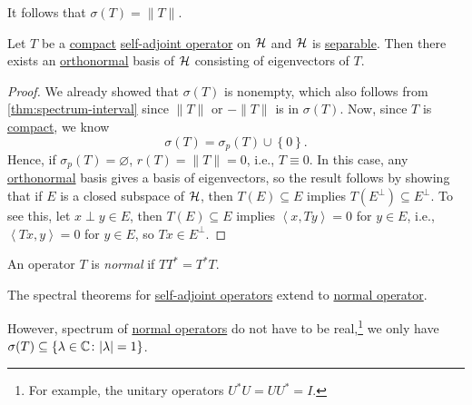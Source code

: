 \begin{remark}
	It follows that \(\sigma (T) = \lVert T \rVert \).
\end{remark}

\begin{theorem}
	Let \(T\) be a \hyperref[def:compact-op]{compact} \hyperref[def:self-adjoint-op]{self-adjoint operator} on \(\mathcal{\MakeUppercase{h}} \) and \(\mathcal{\MakeUppercase{h}} \) is \hyperref[def:separable]{separable}. Then there exists an \hyperref[def:orthonormal-system]{orthonormal} basis of \(\mathcal{\MakeUppercase{h}} \) consisting of eigenvectors of \(T\).
\end{theorem}
\begin{proof}
	We already showed that \(\sigma (T)\) is nonempty, which also follows from \autoref{thm:spectrum-interval} since \(\lVert T \rVert \) or \(-\lVert T \rVert \) is in \(\sigma (T)\). Now, since \(T\) is \hyperref[def:compact-op]{compact}, we know
	\[
		\sigma (T) = \sigma _p(T) \cup \left\{ 0 \right\}.
	\]
	Hence, if \(\sigma _p(T)= \varnothing \), \(r(T) = \lVert T \rVert = 0\), i.e., \(T \equiv 0\). In this case, any \hyperref[def:orthonormal-system]{orthonormal} basis gives a basis of eigenvectors, so the result follows by showing that if \(E\) is a closed subspace of \(\mathcal{\MakeUppercase{h}} \), then \(T(E) \subseteq E\) implies \(T(E^{\perp} ) \subseteq E^{\perp} \). To see this, let \(x \perp y \in E\), then \(T(E) \subseteq E\) implies \(\left\langle x, Ty \right\rangle = 0\) for \(y\in E\), i.e., \(\left\langle Tx, y \right\rangle = 0\) for \(y\in E\), so \(Tx\in E^{\perp} \).
\end{proof}

\begin{definition}\label{def:normal-op}
	An operator \(T\) is \emph{normal} if \(T T^{\ast} = T^{\ast} T\).
\end{definition}

\begin{remark}
	The spectral theorems for \hyperref[def:self-adjoint-op]{self-adjoint operators} extend to \hyperref[def:normal-op]{normal operator}.
\end{remark}

However, spectrum of \hyperref[def:normal-op]{normal operators} do not have to be real,\footnote{For example, the unitary operators \(U^{\ast} U = U U^{\ast} = I\).} we only have \(\sigma (T) \subseteq \left\{ \lambda \in \mathbb{\MakeUppercase{c}} \colon \vert \lambda  \vert =1 \right\} \).

